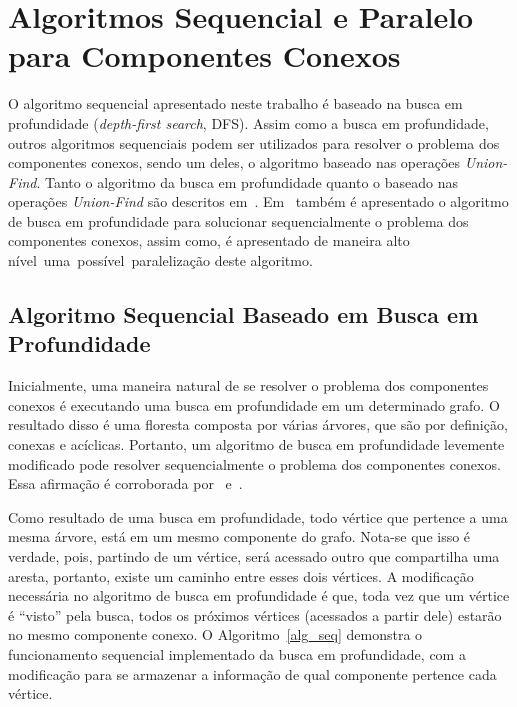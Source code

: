 \documentclass[12pt]{article}
\begin{document}
\section{Algoritmos Sequencial e Paralelo para Componentes Conexos}
O algoritmo sequencial apresentado neste trabalho é baseado na busca em profundidade (\emph{depth-first search}, DFS). Assim como a busca em profundidade, outros algoritmos sequenciais podem ser utilizados para resolver o problema dos componentes conexos, sendo um deles, o algoritmo baseado nas operações \emph{Union-Find}. Tanto o algoritmo da busca em profundidade quanto o baseado nas operações \emph{Union-Find} são descritos em~\cite{Sedgewick:2011}. Em~\cite{Grama:2003} também é apresentado o algoritmo de busca em profundidade para solucionar sequencialmente o problema dos componentes conexos, assim como, é apresentado de maneira alto nível uma possível paralelização deste algoritmo.

\subsection{Algoritmo Sequencial Baseado em Busca em Profundidade}

Inicialmente, uma maneira natural de se resolver o problema dos componentes conexos é executando uma busca em profundidade em um determinado grafo. O resultado disso é uma floresta composta por várias árvores, que são por definição, conexas e acíclicas. Portanto, um algoritmo de busca em profundidade levemente modificado pode resolver sequencialmente o problema dos componentes conexos. Essa afirmação é corroborada por~\cite{Grama:2003} e~\cite{Sedgewick:2011}.

Como resultado de uma busca em profundidade, todo vértice que pertence a uma mesma árvore, está em um mesmo componente do grafo. Nota-se que isso é verdade, pois, partindo de um vértice, será acessado outro que compartilha uma aresta, portanto, existe um caminho entre esses dois vértices. A modificação necessária no algoritmo de busca em profundidade é que, toda vez que um vértice é ``visto'' pela busca, todos os próximos vértices (acessados a partir dele) estarão no mesmo componente conexo. O Algoritmo~\ref{alg_seq} demonstra o funcionamento sequencial implementado da busca em profundidade, com a modificação para se armazenar a informação de qual componente pertence cada vértice.
\end{document}
